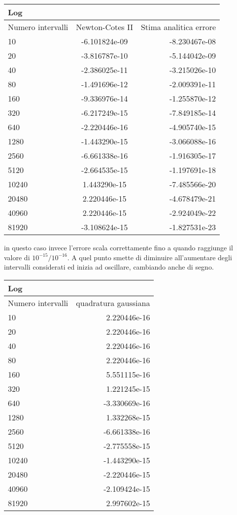 \begin{center}
\begin{longtable}[h]{lcr}
\toprule
Log & & \\
\midrule
Numero intervalli & Newton-Cotes II & Stima analitica errore  \\
\midrule
10 & 	  -6.101824e-09  	 & -8.230467e-08 \\  
20 & 	  -3.816787e-10  	 & -5.144042e-09 \\  
40 & 	  -2.386025e-11  	 & -3.215026e-10 \\  
80 & 	  -1.491696e-12  	 & -2.009391e-11 \\  
160 & 	  -9.336976e-14  	 & -1.255870e-12 \\  
320 & 	  -6.217249e-15  	 & -7.849185e-14 \\  
640 & 	  -2.220446e-16  	 & -4.905740e-15 \\  
1280 & 	  -1.443290e-15  	 & -3.066088e-16 \\  
2560 & 	  -6.661338e-16 	 & -1.916305e-17 \\  
5120 & 	  -2.664535e-15 	 & -1.197691e-18 \\  
10240 &  1.443290e-15  	 & -7.485566e-20 \\  
20480 &  2.220446e-15  	 & -4.678479e-21 \\  
40960 &  2.220446e-15  	 & -2.924049e-22 \\  
81920 &  -3.108624e-15   	&-1.827531e-23 \\  
\bottomrule
\end{longtable}
\end{center}
in questo caso invece l'errore scala correttamente fino a quando raggiunge il valore di $ 10^{-15}/ 10^{-16}$. A quel punto smette di
diminuire all'aumentare degli intervalli considerati ed inizia ad oscillare, cambiando anche di segno.
\begin{center}
\begin{longtable}[h]{lr}
\toprule
Log & \\
\midrule
Numero intervalli & quadratura gaussiana \\
10 &	2.220446e-16 \\
20 &	2.220446e-16 \\
40 &	2.220446e-16 \\ 
80 &	2.220446e-16 \\
160 &	5.551115e-16 \\ 
320 & 	1.221245e-15 \\
640 &	-3.330669e-16 \\ 
1280 &	1.332268e-15 \\
2560 &	 -6.661338e-16 \\
5120 &	 -2.775558e-15 \\ 
10240 &	-1.443290e-15 \\ 
20480 &	 -2.220446e-15 \\
40960 &	 -2.109424e-15 \\ 
81920 &	2.997602e-15 \\
\midrule

\bottomrule
\end{longtable}
\end{center}

